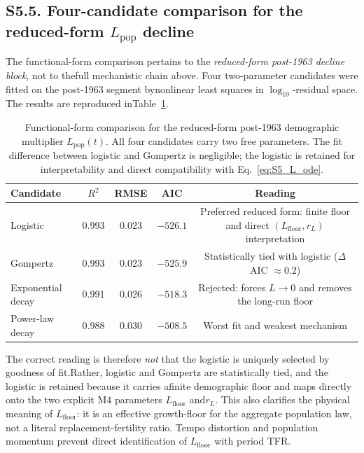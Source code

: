 \documentclass[11pt]{article}
\begin{document}
\subsection*{S5.5. Four-candidate comparison for the reduced-form $L_{\mathrm{pop}}$ decline}\label{subsec:S5_Lpop_candidates}
The functional-form comparison pertains to the \emph{reduced-form post-1963 decline block}, not to thefull mechanistic chain above. Four two-parameter candidates were fitted on the post-1963 segment bynonlinear least squares in $\log_{10}$-residual space. The results are reproduced inTable~\ref{tab:S5_Lpop_forms}.\begin{table}[H]\centering\caption{Functional-form comparison for the reduced-form post-1963 demographic multiplier $L_{\mathrm{pop}}(t)$. All four candidates carry two free parameters. The fit difference between logistic and Gompertz is negligible; the logistic is retained for interpretability and direct compatibility with Eq.~\eqref{eq:S5_L_ode}.}\label{tab:S5_Lpop_forms}\begin{tabular}{lcccc}\toprule
Candidate & $R^2$ & RMSE & AIC & Reading \\\midrule
Logistic & 0.993 & 0.023 & $-526.1$ & Preferred reduced form: finite floor and direct $(L_{\mathrm{floor}},r_L)$ interpretation \\Gompertz & 0.993 & 0.023 & $-525.9$ & Statistically tied with logistic ($\Delta$AIC $\approx 0.2$) \\Exponential decay & 0.991 & 0.026 & $-518.3$ & Rejected: forces $L\to 0$ and removes the long-run floor \\Power-law decay & 0.988 & 0.030 & $-508.5$ & Worst fit and weakest mechanism \\\bottomrule
\end{tabular}\end{table}
The correct reading is therefore \emph{not} that the logistic is uniquely selected by goodness of fit.Rather, logistic and Gompertz are statistically tied, and the logistic is retained because it carries afinite demographic floor and maps directly onto the two explicit M4 parameters $L_{\mathrm{floor}}$ and$r_L$.
This also clarifies the physical meaning of $L_{\mathrm{floor}}$:
it is an effective growth-floor for the aggregate population law, not a literal replacement-fertility ratio.
Tempo distortion and population momentum prevent direct identification of $L_{\mathrm{floor}}$ with period TFR.
\end{document}
